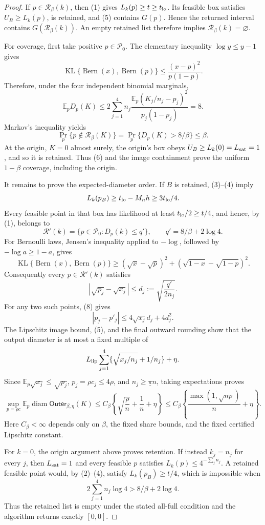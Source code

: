 \documentclass{article}
\begin{document}
\begin{proof}
If \(p\in\mathcal R_\beta(k)\), then (1) gives \(L_k(p)\ge t\ge t_{\rm lo}\).  Its feasible box satisfies \(U_B\ge L_k(p)\), is retained, and (5) contains \(G(p)\).  Hence the returned interval contains \(G(\mathcal R_\beta(k))\).  An empty retained list therefore implies \(\mathcal R_\beta(k)=\varnothing\).

For coverage, first take positive \(p\in\mathcal P_0\).  The elementary inequality \(\log y\le y-1\) gives
\[
\operatorname{KL}\{\operatorname{Bern}(x),\operatorname{Bern}(p)\}
\le\frac{(x-p)^2}{p(1-p)}.
\]
Therefore, under the four independent binomial marginals,
\[
\mathbb E_pD_p(K)
\le2\sum_{j=1}^4n_j
\frac{\mathbb E_p(K_j/n_j-p_j)^2}{p_j(1-p_j)}=8.
\]
Markov's inequality yields
\[
\Pr_p\{p\notin\mathcal R_\beta(K)\}
=\Pr_p\{D_p(K)>8/\beta\}\le\beta.
\tag{6}
\]
At the origin, \(K=0\) almost surely, the origin's box obeys \(U_B\ge L_k(0)=L_{\rm sat}=1\), and so it is retained.  Thus (6) and the image containment prove the uniform \(1-\beta\) coverage, including the origin.

It remains to prove the expected-diameter order.  If \(B\) is retained, (3)--(4) imply
\[
L_k(p_B)\ge t_{\rm lo}-M_nh\ge3t_{\rm lo}/4.
\]
Every feasible point in that box has likelihood at least \(t_{\rm lo}/2\ge t/4\), and hence, by (1), belongs to
\[
\mathcal R'(k)=\{p\in\mathcal P_0:D_p(k)\le q'\},
\qquad q'=8/\beta+2\log4.
\tag{7}
\]
For Bernoulli laws, Jensen's inequality applied to \(-\log\), followed by \(-\log a\ge1-a\), gives
\[
\operatorname{KL}\{\operatorname{Bern}(x),\operatorname{Bern}(p)\}
\ge(\sqrt x-\sqrt p)^2+(\sqrt{1-x}-\sqrt{1-p})^2.
\]
Consequently every \(p\in\mathcal R'(k)\) satisfies
\[
|\sqrt{p_j}-\sqrt{x_j}|\le d_j:=\sqrt{\frac{q'}{2n_j}}.
\tag{8}
\]
For any two such points, (8) gives
\[
|p_j-p'_j|\le4\sqrt{x_j}d_j+4d_j^2.
\tag{9}
\]
The Lipschitz image bound, (5), and the final outward rounding show that the output diameter is at most a fixed multiple of
\[
L_{\rm lip}\sum_{j=1}^4\{\sqrt{x_j/n_j}+1/n_j\}+\eta.
\]
Since \(\mathbb E_p\sqrt{x_j}\le\sqrt{p_j}\), \(p_j=\rho c_j\le4\rho\), and \(n_j\ge\underline\pi n\), taking expectations proves
\[
\sup_{p=\rho c}\mathbb E_p\operatorname{diam}\mathsf{Outer}_{\beta,\eta}(K)
\le C_\beta\left\{\sqrt{\frac\rho n}+\frac1n+\eta\right\}
\le C_\beta\left\{\frac{\max(1,\sqrt{n\rho})}{n}+\eta\right\}.
\]
Here \(C_\beta<\infty\) depends only on \(\beta\), the fixed share bounds, and the fixed certified Lipschitz constant.

For \(k=0\), the origin argument above proves retention.  If instead \(k_j=n_j\) for every \(j\), then \(L_{\rm sat}=1\) and every feasible \(p\) satisfies \(L_k(p)\le4^{-\sum_jn_j}\).  A retained feasible point would, by (2)--(4), satisfy \(L_k(p_B)\ge t/4\), which is impossible when
\[
2\sum_{j=1}^4n_j\log4>8/\beta+2\log4.
\]
Thus the retained list is empty under the stated all-full condition and the algorithm returns exactly \([0,0]\).
\end{proof}
\end{document}
